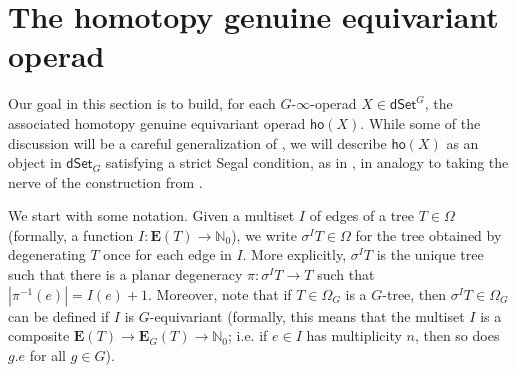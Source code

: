 \documentclass[a4paper,10pt
,draft
]{article}%
\numberwithin{equation}{section}
\numberwithin{figure}{section}
\theoremstyle{definition} %
\newcommand{\1}{\ensuremath{\mathbbm 1}}%
\begin{document}
\section{The homotopy genuine equivariant operad}
\label{HGEO AP}

Our goal in this section is to build,
for each $G$-$\infty$-operad $X \in \mathsf{dSet}^G$,
the associated homotopy genuine equivariant operad
$\mathsf{ho} (X)$.
While some of the discussion will be a careful generalization of \cite[\S 6]{MW09},
we will describe $\mathsf{ho} (X)$ as an object in
$\mathsf{dSet}_G$
satisfying a strict Segal condition, as in \cite[\S 3.3]{BP_edss},
in analogy to taking the nerve of the construction from \cite{MW09}.

We start with some notation. 
Given a multiset $I$ of edges of a tree $T \in \Omega$
(formally, a function 
$I \colon \boldsymbol{E}(T) \to \mathbb{N}_0$),
we write $\sigma^I T \in \Omega$
for the tree obtained by degenerating $T$ once for each edge in $I$.
More explicitly, $\sigma^I T$ is the unique tree such that there is a planar degeneracy
$\pi \colon \sigma^I T \to T$
such that $|\pi^{-1}(e)| = I(e) + 1$.
Moreover,
note that if $T\in \Omega_G$ is a $G$-tree, 
then $\sigma^{I} T \in \Omega_{G}$
can be defined if $I$ is $G$-equivariant
(formally, this means that the multiset $I$ is a composite
$\boldsymbol{E}(T) \to \boldsymbol{E}_G(T)
\to \mathbb{N}_0$;
i.e. if $e \in I$ has multiplicity $n$, then so does $ g.e$ for all $g \in G$).
\end{document}
